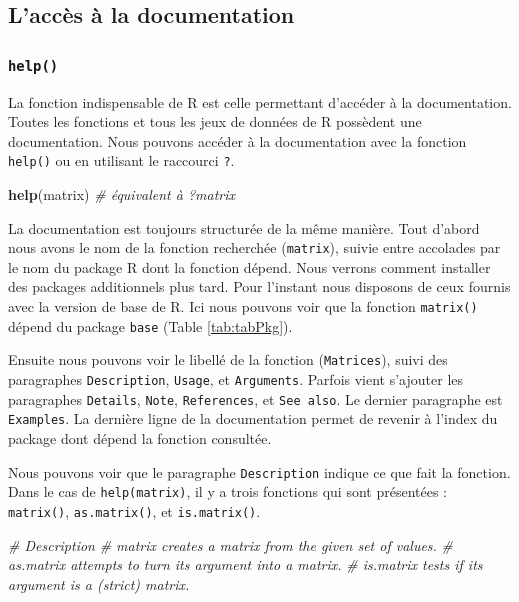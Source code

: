 \documentclass[twoside,symmetric]{book}
\newenvironment{Shaded}{}{}
\newcommand{\CommentTok}[1]{\textit{#1}}
\newcommand{\KeywordTok}[1]{\textbf{#1}}
\newcommand{\NormalTok}[1]{#1}
\begin{document}
\hypertarget{laccuxe8s-uxe0-la-documentation}{%
\subsection{L'accès à la documentation}\label{laccuxe8s-uxe0-la-documentation}}

\hypertarget{l015help}{%
\subsubsection{\texorpdfstring{\texttt{help()}}{help()}}\label{l015help}}

La fonction indispensable de R est celle permettant d'accéder à la documentation. Toutes les fonctions et tous les jeux de données de R possèdent une documentation. Nous pouvons accéder à la documentation avec la fonction \texttt{help()} ou en utilisant le raccourci \texttt{?}.

\begin{Shaded}
\begin{Highlighting}[]
\KeywordTok{help}\NormalTok{(matrix) }\CommentTok{# équivalent à ?matrix}
\end{Highlighting}
\end{Shaded}

La documentation est toujours structurée de la même manière. Tout d'abord nous avons le nom de la fonction recherchée (\texttt{matrix}), suivie entre accolades par le nom du package R dont la fonction dépend. Nous verrons comment installer des packages additionnels plus tard. Pour l'instant nous disposons de ceux fournis avec la version de base de R. Ici nous pouvons voir que la fonction \texttt{matrix()} dépend du package \texttt{base} (Table \ref{tab:tabPkg}).

Ensuite nous pouvons voir le libellé de la fonction (\texttt{Matrices}), suivi des paragraphes \texttt{Description}, \texttt{Usage}, et \texttt{Arguments}. Parfois vient s'ajouter les paragraphes \texttt{Details}, \texttt{Note}, \texttt{References}, et \texttt{See\ also}. Le dernier paragraphe est \texttt{Examples}. La dernière ligne de la documentation permet de revenir à l'index du package dont dépend la fonction consultée.

Nous pouvons voir que le paragraphe \texttt{Description} indique ce que fait la fonction. Dans le cas de \texttt{help(matrix)}, il y a trois fonctions qui sont présentées : \texttt{matrix()}, \texttt{as.matrix()}, et \texttt{is.matrix()}.

\begin{Shaded}
\begin{Highlighting}[]
\CommentTok{# Description}
\CommentTok{# matrix creates a matrix from the given set of values.}
\CommentTok{# as.matrix attempts to turn its argument into a matrix.}
\CommentTok{# is.matrix tests if its argument is a (strict) matrix.}
\end{Highlighting}
\end{Shaded}
\end{document}
